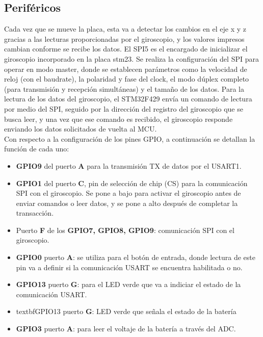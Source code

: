 
\subsection{Periféricos}


Cada vez que se mueve la placa, esta va a detectar los cambios en el eje x y z gracias a las lecturas proporcionadas por el giroscopio, y los valores impresos cambian conforme se recibe los datos. El SPI5 es el encargado de inicializar el giroscopio incorporado en la placa stm23. Se realiza la configuración del SPI para operar en modo master, donde se establecen parámetros como la velocidad de reloj (con el baudrate), la polaridad y fase del clock, el modo dúplex completo (para transmisión y recepción simultáneas) y el tamaño de los datos. Para la lectura de los datos del giroscopio, el STM32F429 envía un comando de lectura por medio del SPI, seguido por la dirección del registro del giroscopio que se busca leer, y una vez que ese comando es recibido, el giroscopio responde enviando los datos solicitados de vuelta al MCU. \\

Con respecto a la configuración de los pines GPIO, a continuación se detallan la función de cada uno:
\begin{itemize}
    \item \textbf{GPIO9} del puerto \textbf{A} para la transmisión TX de datos por el USART1.
    \item \textbf{GPIO1} del puerto \textbf{C}, pin de selección de chip (CS) para la comunicación SPI con el giroscopio. Se pone a bajo para activar el giroscopio antes de enviar comandos o leer datos, y se pone a alto después de completar la transacción.
    \item Puerto \textbf{F} de los \textbf{GPIO7, GPIO8, GPIO9}: comunicación SPI con el giroscopio.
    \item \textbf{GPIO0} puerto \textbf{A}: se utiliza para el botón de entrada, donde lectura de este pin va a definir si la comunicación USART se encuentra habilitada o no.
    \item \textbf{GPIO13} puerto \textbf{G}: para el LED verde que va a indiciar el estado de la comunicación USART.
    \item textbf{GPIO13} puerto \textbf{G}: LED verde que señala el estado de la batería
    \item \textbf{GPIO3} puerto \textbf{A}: para leer el voltaje de la batería a través del ADC.
\end{itemize}


